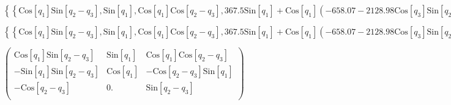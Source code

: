 \documentclass{article}
\begin{document}
\begin{doublespace}
\noindent\(\left\{\left\{\text{Cos}\left[q_1\right] \text{Sin}\left[q_2-q_3\right],\text{Sin}\left[q_1\right],\text{Cos}\left[q_1\right] \text{Cos}\left[q_2-q_3\right],367.5
\text{Sin}\left[q_1\right]+\text{Cos}\left[q_1\right] \left(-658.07-2128.98 \text{Cos}\left[q_3\right] \text{Sin}\left[q_2\right]+\text{Cos}\left[q_2\right]
\left(-1689.31+2128.98 \text{Sin}\left[q_3\right]\right)\right)\right\},\left\{-\text{Sin}\left[q_1\right] \text{Sin}\left[q_2-q_3\right],\text{Cos}\left[q_1\right],-\text{Cos}\left[q_2-q_3\right]
\text{Sin}\left[q_1\right],367.5 \text{Cos}\left[q_1\right]+\text{Sin}\left[q_1\right] \left(658.07\, +2128.98 \text{Cos}\left[q_3\right] \text{Sin}\left[q_2\right]+\text{Cos}\left[q_2\right]
\left(1689.31\, -2128.98 \text{Sin}\left[q_3\right]\right)\right)\right\},\left\{-\text{Cos}\left[q_2-q_3\right],0,\text{Sin}\left[q_2-q_3\right],1134.\,
+2128.98 \text{Cos}\left[q_2\right] \text{Cos}\left[q_3\right]+\text{Sin}\left[q_2\right] \left(-1689.31+2128.98 \text{Sin}\left[q_3\right]\right)\right\},\{0.,0.,0.,1.\}\right\}[2,4]\)
\end{doublespace}

\begin{doublespace}
\noindent\(\left\{\left\{\text{Cos}\left[q_1\right] \text{Sin}\left[q_2-q_3\right],\text{Sin}\left[q_1\right],\text{Cos}\left[q_1\right] \text{Cos}\left[q_2-q_3\right],367.5
\text{Sin}\left[q_1\right]+\text{Cos}\left[q_1\right] \left(-658.07-2128.98 \text{Cos}\left[q_3\right] \text{Sin}\left[q_2\right]+\text{Cos}\left[q_2\right]
\left(-1689.31+2128.98 \text{Sin}\left[q_3\right]\right)\right)\right\},\left\{-\text{Sin}\left[q_1\right] \text{Sin}\left[q_2-q_3\right],\text{Cos}\left[q_1\right],-\text{Cos}\left[q_2-q_3\right]
\text{Sin}\left[q_1\right],367.5 \text{Cos}\left[q_1\right]+\text{Sin}\left[q_1\right] \left(658.07\, +2128.98 \text{Cos}\left[q_3\right] \text{Sin}\left[q_2\right]+\text{Cos}\left[q_2\right]
\left(1689.31\, -2128.98 \text{Sin}\left[q_3\right]\right)\right)\right\},\left\{-\text{Cos}\left[q_2-q_3\right],0,\text{Sin}\left[q_2-q_3\right],1134.\,
+2128.98 \text{Cos}\left[q_2\right] \text{Cos}\left[q_3\right]+\text{Sin}\left[q_2\right] \left(-1689.31+2128.98 \text{Sin}\left[q_3\right]\right)\right\},\{0.,0.,0.,1.\}\right\}[3,4]\)
\end{doublespace}

\begin{doublespace}
\noindent\(\left(
\begin{array}{ccc}
 \text{Cos}\left[q_1\right] \text{Sin}\left[q_2-q_3\right] & \text{Sin}\left[q_1\right] & \text{Cos}\left[q_1\right] \text{Cos}\left[q_2-q_3\right]
\\
 -\text{Sin}\left[q_1\right] \text{Sin}\left[q_2-q_3\right] & \text{Cos}\left[q_1\right] & -\text{Cos}\left[q_2-q_3\right] \text{Sin}\left[q_1\right]
\\
 -\text{Cos}\left[q_2-q_3\right] & 0. & \text{Sin}\left[q_2-q_3\right] \\
\end{array}
\right)\)
\end{doublespace}
\end{document}
